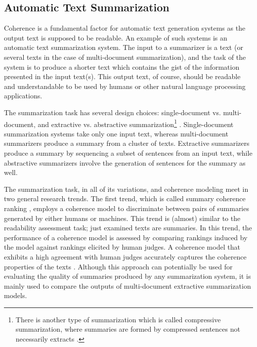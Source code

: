 \subsection{Automatic Text Summarization}

Coherence is a fundamental factor for automatic text generation systems as the output text is supposed to be readable. 
An example of such systems is an automatic text summarization system.
The input to a summarizer is a text (or several texts in the case of multi-document summarization), and the task of the system is to produce a shorter text which contains the gist of the information presented in the input text(s). 
This output text, of course, should be readable and understandable to be used by humans or other natural language processing applications. 

The summarization task has several design choices: single-document vs. multi-document, and extractive vs. abstractive summarization\footnote{There is another type of summarization which is called compressive summarization, where summaries are formed by compressed sentences not necessarily extracts \cite{knight00}.} \cite{hahn00}. 
Single-document summarization systems take only one input text, whereas multi-document summarizers produce a summary from a cluster of texts. 
Extractive summarizers \cite{kupiec95,carbonell98,gillick09} produce a summary by sequencing a subset of sentences from an input text, while abstractive summarizers \cite{wanglu13b,alfonseca13} involve the generation of sentences for the summary as well.   

The summarization task, in all of its variations, and coherence modeling meet in two general research trends. 
The first trend, which is called summary coherence ranking \cite{barzilay08,guinaudeau13}, employs a coherence model to discriminate between pairs of summaries generated by either humans or machines. 
This trend is (almost) similar to the readability assessment task; just examined texts are summaries. 
In this trend, the performance of a coherence model is assessed by comparing rankings induced by the model against rankings elicited by human judges. 
A coherence model that exhibits a high agreement with human judges accurately captures the coherence properties of the texts \cite{barzilay08}. 
Although this approach can potentially be used for evaluating the quality of summaries produced by any summarization system, it is mainly used to compare the outputs of \mbox{multi-document} extractive summarization models.  

